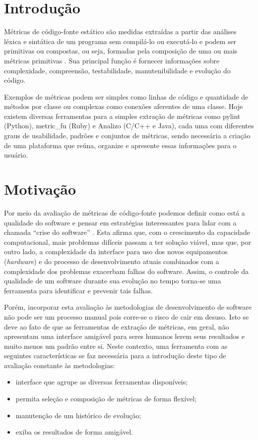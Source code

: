 \documentclass[12pt]{article}
\begin{document}
\section{Introdução} \label{sec:intro}
Métricas de código-fonte estático são medidas extraídas a partir das análises léxica e sintática de um programa sem compilá-lo ou executá-lo e podem ser primitivas ou compostas, ou seja, formadas pela composição de uma ou mais métricas primitivas . Sua principal função é fornecer informações sobre complexidade, compreensão, testabilidade, manutenibilidade e evolução do código\cite{m13}.

Exemplos de métricas podem ser simples como linhas de código e quantidade de métodos por classe ou complexas como conexões aferentes de uma classe.
Hoje existem diversas ferramentas para a simples extração de métricas como  pylint (Python), metric\_fu (Ruby) e Analizo (C/C++ e Java), cada uma com diferentes graus de usabilidade, padrões e conjuntos de métricas, sendo necessária a criação de uma plataforma que reúna, organize e apresente essas informações para o usuário.

\section{Motivação}
Por meio da avaliação de métricas de código-fonte podemos definir como está a qualidade do software e pensar em estratégias interessantes para lidar com a chamada ``crise do software'' \cite{nr68}. Esta afirma que, com o crescimento da capacidade computacional, mais problemas difíceis passam a ter solução viável, mas que, por outro lado, a complexidade da interface para uso dos novos equipamentos (\textit{hardware}) e do processo de desenvolvimento atuais combinados com a complexidade dos problemas exacerbam falhas do software. Assim, o controle da qualidade de um software durante sua evolução no tempo torna-se uma ferramenta para identificar e prevenir tais falhas.

Porém, incorporar esta avaliação às metodologias de desenvolvimento de software não pode ser um processo manual pois corre-se o risco de cair em desuso. Isto se deve ao fato de que as ferramentas de extração de métricas, em geral, não apresentam uma interface amigável para seres humanos lerem seus resultados e muito menos um padrão entre si.
Neste contexto, uma ferramenta com as seguintes características se faz necessária para a introdução deste tipo de avaliação constante às metodologias:
\begin{itemize}
  \item interface que agrupe as diversas ferramentas disponíveis;
  \item permita seleção e composição de métricas de forma flexível;
  \item manutenção de um histórico de evolução;
  \item exiba os resultados de forma amigável.
\end{itemize}
\end{document}
